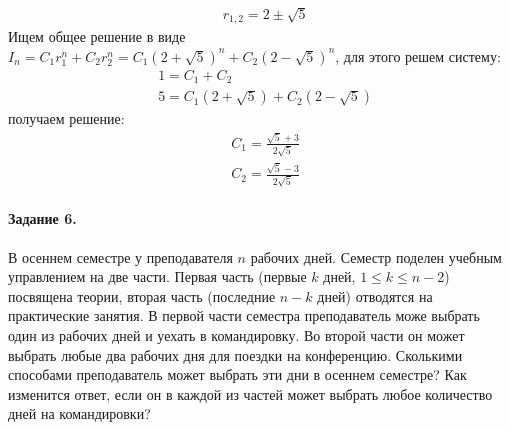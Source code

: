 \documentclass[a4paper,12pt]{article}
\begin{document}
\begin{Solution}
\[\begin{split}
		& r_{1,2} = 2 \pm \sqrt{5}
	\end{split}
\]
Ищем общее решение в виде $I_n = C_1 r_1^n + C_2 r_2^n = C_1 {\left(2 + \sqrt{5}\right)}^n + C_2 {\left(2 - \sqrt{5}\right)}^n$, для этого решем систему:
\[
	\begin{split}
		& 1 = C_1 + C_2 \\
		& 5 = C_1 \left(2 + \sqrt{5}\right) + C_2 \left(2 - \sqrt{5}\right)
	\end{split}
\]
получаем решение:
\[
	\begin{split}
		& C_1 = \frac{\sqrt{5} + 3}{2\sqrt{5}} \\
		& C_2 = \frac{\sqrt{5} - 3}{2\sqrt{5}}
	\end{split}
\]
\end{Solution}

\paragraph{Задание 6.} В осеннем семестре у преподавателя $n$ рабочих дней. Семестр поделен учебным управлением на две части. Первая часть (первые $k$ дней, $1 \le k \le n-2$) посвящена теории, вторая часть (последние $n-k$ дней) отводятся на практические занятия. В первой части семестра преподаватель може выбрать один из рабочих дней и уехать в командировку. Во второй части он может выбрать любые два рабочих дня для поездки на конференцию. Сколькими способами преподаватель может выбрать эти дни в осеннем семестре? Как изменится ответ, если он в каждой из частей может выбрать любое количество дней на командировки?
\end{document}
